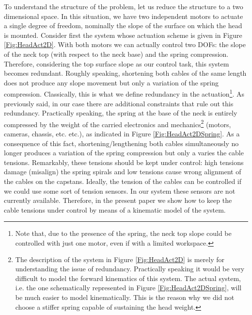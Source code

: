 \documentclass[conference]{IEEEtran}
\numberwithin{equation}{section}
\begin{document}
To understand the structure of the problem, let us reduce the structure to a two dimensional space. In this situation, we have two independent motors to actuate a single degree of freedom, nominally the slope of the surface on which the head is mounted.
Consider first the system whose actuation scheme is given in Figure \ref{Fig:HeadAct2D}. With both motors we can actually control two DOFs: the slope of the neck top (with respect to the neck base) and the spring compression. Therefore, considering the top surface slope as our control task, this system becomes redundant. Roughly speaking, shortening both cables of the same length does not produce any slope movement but only a variation of the spring compression. Classically, this is what we define redundancy in the actuation\footnote{Note that, due to the presence of the spring, the neck top slope could be controlled with just one motor, even if with a limited workspace.}.
As previously said, in our case there are additional constraints that rule out this redundancy. Practically speaking, the spring at the base of the neck is entirely compressed by the weight of the carried electronics and mechanics\footnote{The description of the system in Figure \ref{Fig:HeadAct2D} is merely for understanding the issue of redundancy. Practically speaking it would be very difficult to model the forward kinematics of this system. The actual system, i.e. the one schematically represented in Figure \ref{Fig:HeadAct2DSpring}, will be much easier to model kinematically. This is the reason why we did not choose a stiffer spring capable of sustaining the head weight.} (motors, cameras, chassis, etc. etc.), as indicated in Figure \ref{Fig:HeadAct2DSpring}. As a consequence of this fact, shortening/lengthening both cables simultaneously no longer produces a variation of the spring compression but only a varies the cable tensions. Remarkably, these tensions should be kept under control: high tensions damage (misalign) the spring spirals and low tensions cause wrong alignment of the cables on the capstans. Ideally, the tension of the cables can be controlled if we could use some sort of tension sensors. In our system these sensors are not currently available. Therefore, in the present paper we show how to keep the cable tensions under control by means of a kinematic model of the system.
\end{document}
